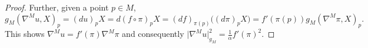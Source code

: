 \documentclass[12pt]{article}
\newcommand{\MA}[1]{\textcolor{marieamelie}{#1}}
\numberwithin{lemma}{section}
\newcommand{\grad}{\nabla}
\begin{document}
{\begin{proof}
\color{black}
Further, given a point $p\in M$,
\[g_M(\nabla^M u,X)_p=(du)_pX = d(f\circ\pi)_pX = (df)_{\pi(p)}\Big( (d\pi)_pX\Big) =f'(\pi(p)) g_M(\nabla^M \pi,X)_p.\] 
This shows $\nabla^M u=f'(\pi)\nabla^M\pi$ and consequently $\vert \grad^M u\vert_{g_M}^2=  \frac{1}{\alpha} f'(\pi)^2$.

\end{proof}}
\end{document}
